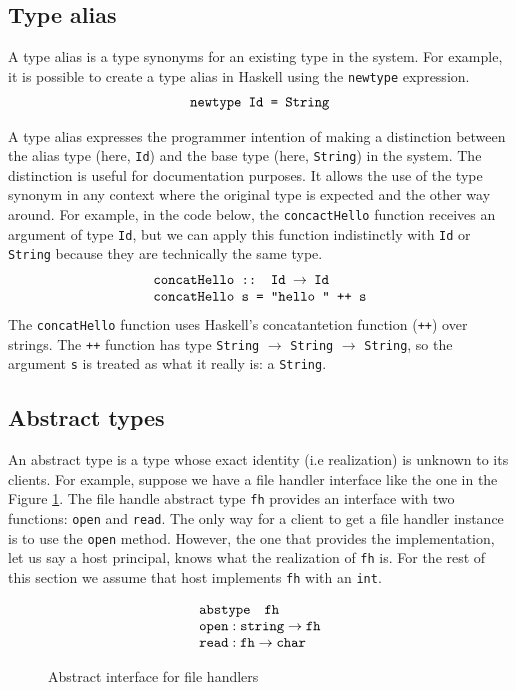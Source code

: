 \documentclass{article}
\newcommand\icode[1]{\texttt{#1}}
\begin{document}
\subsection{Type alias}
A type alias is a type synonyms for an existing type in the system. For example, it is possible to create a type alias in Haskell using the \icode{newtype} expression.
\[
\begin{tabular}{c}
\icode{newtype Id = String}
\\
\end{tabular}
\]

A type alias expresses the programmer intention of making a distinction between the alias type (here, \icode{Id}) and the base type (here, \icode{String}) in the system. The distinction is useful for documentation purposes. It allows the use of the type synonym in any context where the original type is expected and the other way around. For example, in the code below, the \icode{concactHello} function receives an argument of type \icode{Id}, but we can apply this function indistinctly with \icode{Id} or \icode{String} because they are technically the same type.
\[
\begin{tabular}{l}
\icode{concatHello :: Id $\rightarrow$ Id} \\
\icode{concatHello s = "hello " ++ s}
\\
\end{tabular}
\]
The \icode{concatHello} function uses Haskell's concatantetion function (\icode{++}) over strings. The \icode{++} function has type \icode{String} $\rightarrow$ \icode{String} $\rightarrow$ \icode{String}, so the argument \icode{s} is treated as what it really is: a \icode{String}. 

	\subsection{Abstract types}
	An abstract type is a type whose exact identity (i.e realization) is unknown to its clients. For example, suppose we have a file handler interface like the one in the Figure \ref{fig:abstract_file_handler}. The file handle abstract type \icode{fh} provides an interface with two functions: \icode{open} and \icode{read}. The only way for a client to get a file handler instance is to use the \texttt{open} method.	However, the one that provides the implementation, let us say a {\sf host} principal, knows what the realization of \icode{fh} is. For the rest of this section we assume that {\sf host} implements \icode{fh} with an \icode{int}.  
	\begin{figure}[!htbp]
\[
	\begin{tabular}{l}	
	$\texttt{abstype} \quad \texttt{fh}$ \\
	$\texttt{open} : \texttt{string} \rightarrow \texttt{fh} $\\
	$\texttt{read} : \texttt{fh} \rightarrow \texttt{char} $\\
	\end{tabular}
\]
\caption{Abstract interface for file handlers}
		\label{fig:abstract_file_handler}
\end{figure}
\end{document}
